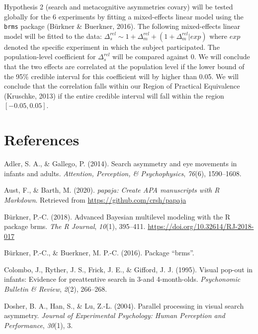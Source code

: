\documentclass[
  english,
  man,floatsintext]{apa6}
\begin{document}
Hypothesis 2 (search and metacognitive asymmetries covary) will be tested globally for the 6 experiments by fitting a mixed-effects linear model using the \texttt{brms} package (Bürkner \& Buerkner, 2016). The following mixed-effects linear model will be fitted to the data: \(\Delta^{rel}_s \sim 1+\Delta^{rel}_m+(1+\Delta^{rel}_m | exp)\) where \(exp\) denoted the specific experiment in which the subject participated. The population-level coefficient for \(\Delta^{rel}_s\) will be compared against 0. We will conclude that the two effects are correlated at the population level if the lower bound of the 95\% credible interval for this coefficient will by higher than 0.05. We will conclude that the correlation falls within our Region of Practical Equivalence (Kruschke, 2013) if the entire credible interval will fall within the region \([-0.05, 0.05]\).

\newpage

\hypertarget{references}{%
\section{References}\label{references}}

\begingroup
\setlength{\parindent}{-0.5in}
\setlength{\leftskip}{0.5in}

\hypertarget{refs}{}
\leavevmode\hypertarget{ref-adler2014search}{}%
Adler, S. A., \& Gallego, P. (2014). Search asymmetry and eye movements in infants and adults. \emph{Attention, Perception, \& Psychophysics}, \emph{76}(6), 1590--1608.

\leavevmode\hypertarget{ref-R-papaja}{}%
Aust, F., \& Barth, M. (2020). \emph{papaja: Create APA manuscripts with R Markdown}. Retrieved from \url{https://github.com/crsh/papaja}

\leavevmode\hypertarget{ref-R-brms_b}{}%
Bürkner, P.-C. (2018). Advanced Bayesian multilevel modeling with the R package brms. \emph{The R Journal}, \emph{10}(1), 395--411. \url{https://doi.org/10.32614/RJ-2018-017}

\leavevmode\hypertarget{ref-burkner2016package}{}%
Bürkner, P.-C., \& Buerkner, M. P.-C. (2016). Package ``brms''.

\leavevmode\hypertarget{ref-colombo1995visual}{}%
Colombo, J., Ryther, J. S., Frick, J. E., \& Gifford, J. J. (1995). Visual pop-out in infants: Evidence for preattentive search in 3-and 4-month-olds. \emph{Psychonomic Bulletin \& Review}, \emph{2}(2), 266--268.

\leavevmode\hypertarget{ref-dosher2004parallel}{}%
Dosher, B. A., Han, S., \& Lu, Z.-L. (2004). Parallel processing in visual search asymmetry. \emph{Journal of Experimental Psychology: Human Perception and Performance}, \emph{30}(1), 3.
\end{document}
